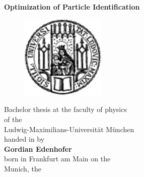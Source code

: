 \thispagestyle{empty}
\begin{center}
	\begin{LARGE}
		{
			\bf
			\hspace*{1cm} Optimization of Particle Identification \\ [0.3cm]
		}
	\end{LARGE}
	\vspace{0.5cm}
	\begin{figure}[htbp]
		\begin{center}
			\hspace*{1cm}
			\includegraphics[height=4cm]{pics/lmu3.pdf}
		\end{center}
	\end{figure}

	\vspace{1.0cm}
	\begin{large}
		\hspace*{1cm}Bachelor thesis at the faculty of physics \\
		\hspace*{1cm}of the \\
		\hspace*{1cm}Ludwig-Maximilians-Universität München \\ [2.5cm]
		\hspace*{1cm}handed in by \\
		{\bf
		\hspace*{1cm}Gordian Edenhofer \\ }
		\hspace*{1cm}born in Frankfurt am Main on the \dateenglish{} \\ [0.5cm]
		\hspace*{1cm}Munich, the \dateenglish{}
	\end{large}
\end{center}
